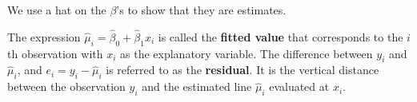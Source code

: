 \begin{remark}
    We use a hat on the $ \beta $'s to show that they are estimates.
\end{remark}
\begin{definition}
    The expression
    $ \hat{\mu}_i=\hat{\beta}_0+\hat{\beta}_1x_i $
    is called the \textbf{fitted value}
    that corresponds to the $ i $th observation
    with $ x_i $ as the explanatory variable.
    The difference between $ y_i $ and $ \hat{\mu}_i $,
    and $ e_i=y_i-\hat{\mu}_i $ is referred
    to as the \textbf{residual}. It is
    the vertical distance between the observation $ y_i $
    and the estimated line $ \hat{\mu}_i $
    evaluated at $ x_i $.
\end{definition}
